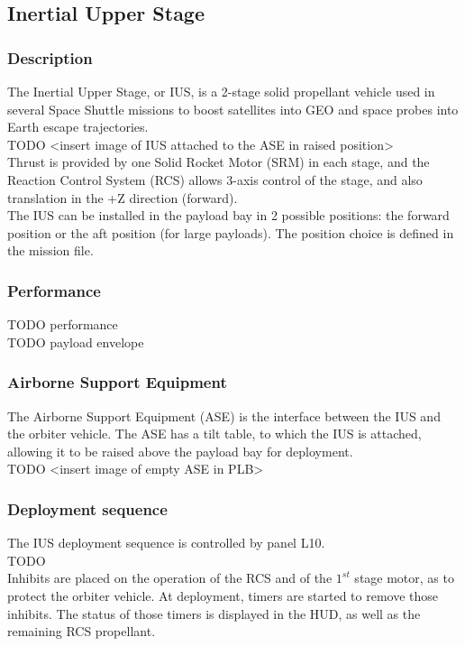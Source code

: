 \documentclass[Space_Shuttle_Ultra_Manual.tex]{subfiles}
\begin{document}
\subsection{Inertial Upper Stage}
\begin{multicols*}{2}
\renewcommand{\cfttoctitlefont}{\bf}
\localtableofcontents
\subsubsection{Description}
\noindent
The Inertial Upper Stage, or IUS, is a 2-stage solid propellant vehicle used in several Space Shuttle missions to boost satellites into GEO and space probes into Earth escape trajectories.
\\
TODO <insert image of IUS attached to the ASE in raised position>
\\
Thrust is provided by one Solid Rocket Motor (SRM) in each stage, and the Reaction Control System (RCS) allows 3-axis control of the stage, and also translation in the +Z direction (forward).
\\
The IUS can be installed in the payload bay in 2 possible positions: the forward position or the aft position (for large payloads). The position choice is defined in the mission file.

\subsubsection{Performance}
TODO performance
\\
TODO payload envelope

\subsubsection{Airborne Support Equipment}
The Airborne Support Equipment (ASE) is the interface between the IUS and the orbiter vehicle. The ASE has a tilt table, to which the IUS is attached, allowing it to be raised above the payload bay for deployment.
\\
TODO <insert image of empty ASE in PLB>

\subsubsection{Deployment sequence}
The IUS deployment sequence is controlled by panel L10.
\\
TODO
\\
Inhibits are placed on the operation of the RCS and of the $1^{st}$ stage motor, as to protect the orbiter vehicle. At deployment, timers are started to remove those inhibits. The status of those timers is displayed in the HUD, as well as the remaining RCS propellant.


\end{multicols*}
\end{document}
